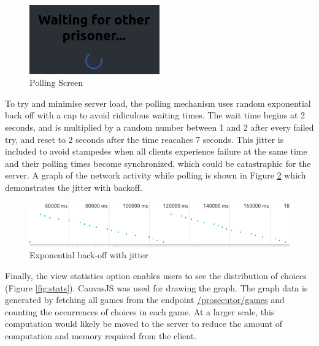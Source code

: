 \documentclass[12pt]{article}
\begin{document}
\begin{figure}[!ht]
        \centering
        \includegraphics[width=0.5\textwidth]{images/polling} %
        \caption{Polling Screen}
        \label{fig:polling}
\end{figure}

To try and minimise server load, the polling mechanism uses random exponential back off with a cap to avoid ridiculous waiting times. The wait time begins at 2 seconds, and is multiplied by a random number between 1 and 2 after every failed try, and reset to 2 seconds after the time reacahes 7 seconds. This jitter is included to avoid stampedes when all clients experience failure at the same time and their polling times become synchronized, which could be catastraphic for the server. A graph of the network activity while polling is shown in Figure \ref{fig:jitter} which demonstrates the jitter with backoff.

\begin{figure}[!ht]
        \centering
        \includegraphics[width=\textwidth]{images/jitter} %
        \caption{Exponential back-off with jitter}
        \label{fig:jitter}
\end{figure}

Finally, the view statistics option enables users to see the distribution of choices (Figure \ref{fig:stats}). CanvasJS \cite{canvasjs} was used for drawing the graph. The graph data is generated by fetching all games from the endpoint \url{/prosecutor/games} and counting the occurrences of choices in each game. At a larger scale, this computation would likely be moved to the server to reduce the amount of computation and memory required from the client. 
\end{document}
